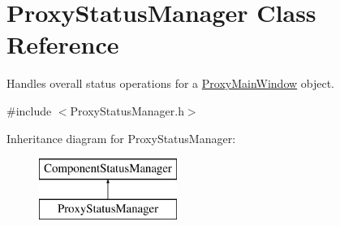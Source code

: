 \hypertarget{class_proxy_status_manager}{\section{Proxy\-Status\-Manager Class Reference}
\label{class_proxy_status_manager}
}


Handles overall status operations for a \hyperlink{class_proxy_main_window}{Proxy\-Main\-Window} object.  




{\ttfamily \#include $<$Proxy\-Status\-Manager.\-h$>$}

Inheritance diagram for Proxy\-Status\-Manager\-:\begin{figure}[H]
\begin{center}
\leavevmode
\includegraphics[height=2.000000cm]{class_proxy_status_manager}
\end{center}
\end{figure}
